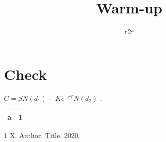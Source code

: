 \documentclass{article}
\begin{document}
\title{Warm-up}\author{r2r}\maketitle
\section{Check}
$C = S N(d_1) - K e^{-rT} N(d_2)$ \cite{x}.
\begin{table}[h]\centering\begin{tabular}{lr}\toprule a & 1\\\bottomrule\end{tabular}\end{table}

\begin{thebibliography}{1} X. Author. Title. 2020.\end{thebibliography}
\end{document}
